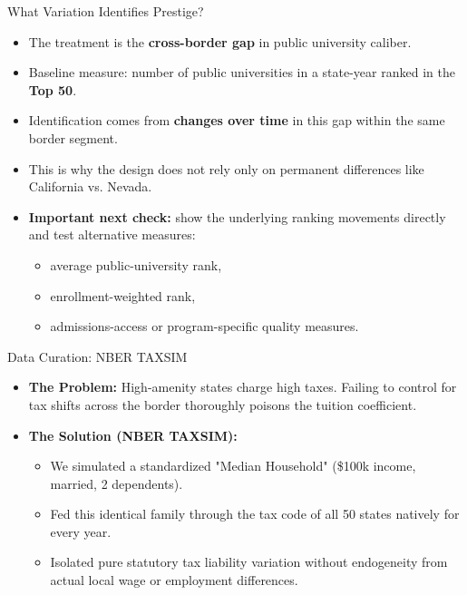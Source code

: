 \documentclass[10pt, aspectratio=169]{beamer}
\begin{document}
\begin{frame}{What Variation Identifies Prestige?}
    \begin{itemize}
        \item The treatment is the \textbf{cross-border gap} in public university caliber.
        \item Baseline measure: number of public universities in a state-year ranked in the \textbf{Top 50}.
        \item Identification comes from \textbf{changes over time} in this gap within the same border segment.
        \item This is why the design does not rely only on permanent differences like California vs. Nevada.
        \item \textbf{Important next check:} show the underlying ranking movements directly and test alternative measures:
        \begin{itemize}
            \item average public-university rank,
            \item enrollment-weighted rank,
            \item admissions-access or program-specific quality measures.
        \end{itemize}
    \end{itemize}
\end{frame}

\begin{frame}{Data Curation: NBER TAXSIM}
    \begin{itemize}
        \item \textbf{The Problem:} High-amenity states charge high taxes. Failing to control for tax shifts across the border thoroughly poisons the tuition coefficient.
        \item \textbf{The Solution (NBER TAXSIM):}
        \begin{itemize}
            \item We simulated a standardized "Median Household" (\$100k income, married, 2 dependents).
            \item Fed this identical family through the tax code of all 50 states natively for every year.
            \item Isolated pure statutory tax liability variation without endogeneity from actual local wage or employment differences.
        \end{itemize}
    \end{itemize}
\end{frame}
\end{document}
